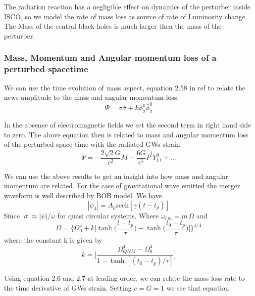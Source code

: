 \documentclass[prd,preprintnumbers,onecolumn,eqsecnum,floatfix,letter]{revtex4}
\begin{document}
The radiation reaction has a negligible effect on dynamics of the perturber inside ISCO, so we model the rate of mass loss as source of rate of Luminosity change. The Mass of the central black holes is much larger then the mass of the perturber.  

\subsubsection{Mass, Momentum and Angular momentum loss of a perturbed spacetime}
We can use the time evolution of mass aspect, equation 2.58 in ref\cite{Adamo_2009} to relate the news amplitude to the mass and angular momentum loss. 
\begin{equation}
	\dot{\Psi} = \dot{\sigma}\dot{\bar{\sigma}} + k\phi^{0}_{2}\bar{\phi}^{0}_{2}
\end{equation}

In the absence of electromagnetic fields we set the second term in right hand side to zero. The above equation then is related to mass and angular momentum loss of the perturbed space time with the radiated GWs strain. 
\begin{equation}
	\dot{\Psi} = -\frac{2\sqrt{2}G}{c^2}\dot{M} -\frac{6G}{c^3}\dot{P}^iY^{0}_{1\,i} + ...
\end{equation}  

We can use the above results to get an insight into how mass and angular momentum are related. For the case of gravitational wave emitted the merger waveform is well described by BOB model. We have 
\begin{equation}
	|\psi_4| = A_{p}\text{sech}[\gamma(t-t_p)]
\end{equation}
Since $|\sigma|\approx |\psi|/\omega$ for quasi circular systems. Where $\omega_{l\,m} = m\,\Omega$ and
\begin{equation}
	\Omega = \Biggl\{\Omega^{4}_{0} + k\Big[\tanh\Big(\frac{t-t_p}{\tau}\Big) -\tanh\Big(\frac{t_0-t_p}{\tau}\Big)\Big]\Biggr\}^{1/4}
\end{equation}
where the constant k is given by
\begin{equation}
	k = \Bigg[\frac{\Omega^{4}_{QNM} - \Omega^4_{0}}{1-\tanh[(t_0-t_p)/\tau]}\Bigg]
\end{equation}

Using equation 2.6 and 2.7 at leading order, we can relate the mass loss rate to the time derivative of GWs strain. Setting $c = G = 1$ we see that equation 
\end{document}
